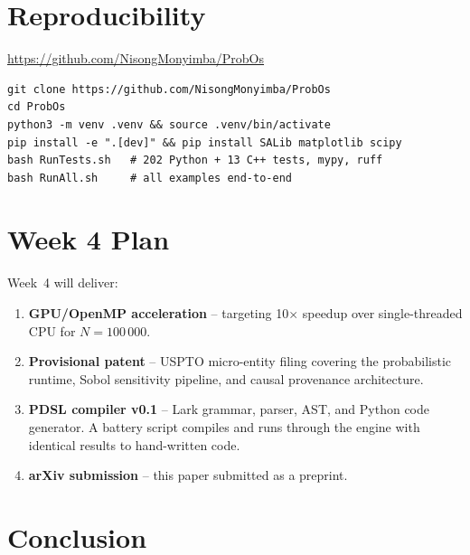 \documentclass[12pt,a4paper]{article}
\theoremstyle{plain}
\theoremstyle{definition}
\theoremstyle{remark}
\begin{document}
\section{Reproducibility}

\begin{center}
\url{https://github.com/NisongMonyimba/ProbOs}
\end{center}

\begin{lstlisting}[style=python,numbers=none]
git clone https://github.com/NisongMonyimba/ProbOs
cd ProbOs
python3 -m venv .venv && source .venv/bin/activate
pip install -e ".[dev]" && pip install SALib matplotlib scipy
bash RunTests.sh   # 202 Python + 13 C++ tests, mypy, ruff
bash RunAll.sh     # all examples end-to-end
\end{lstlisting}

\section{Week 4 Plan}

Week~4 will deliver:
\begin{enumerate}
  \item \textbf{GPU/OpenMP acceleration} -- targeting 10$\times$
    speedup over single-threaded CPU for $N=100\,000$.
  \item \textbf{Provisional patent} -- USPTO micro-entity filing
    covering the probabilistic runtime, Sobol sensitivity pipeline,
    and causal provenance architecture.
  \item \textbf{PDSL compiler v0.1} -- Lark grammar, parser, AST,
    and Python code generator. A battery script compiles and runs
    through the engine with identical results to hand-written code.
  \item \textbf{arXiv submission} -- this paper submitted as
    a preprint.
\end{enumerate}

\section{Conclusion}
\end{document}
